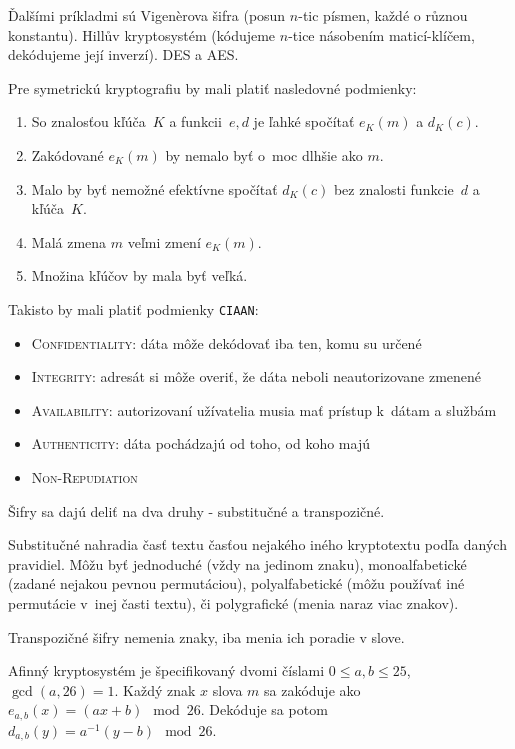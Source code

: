 Ďalšími príkladmi sú Vigenèrova šifra (posun $n$-tic písmen, každé o různou konstantu).
Hillův kryptosystém (kódujeme $n$-tice násobením maticí-klíčem,
dekódujeme její inverzí). DES a AES.

Pre symetrickú kryptografiu by mali platiť nasledovné podmienky:
\begin{enumerate}
	\item So znalosťou kľúča~$K$ a funkcii~$e,d$ je ľahké spočítať
	$e_K(m)$ a $d_K(c)$.
	\item Zakódované $e_K(m)$ by nemalo byť o~moc dlhšie ako $m$.
	\item Malo by byť nemožné efektívne spočítať $d_K(c)$ bez znalosti
	funkcie~$d$ a kľúča~$K$.
	\item Malá zmena $m$ veľmi zmení $e_K(m)$.
	\item Množina kľúčov by mala byť veľká.
\end{enumerate}

Takisto by mali platiť podmienky \verb|CIAAN|:
\begin{itemize}
	\item \textsc{Confidentiality}: dáta môže dekódovať iba ten, 
	komu su určené
	\item \textsc{Integrity}: adresát si môže overiť, že dáta neboli 
	neautorizovane zmenené
	\item \textsc{Availability}: autorizovaní užívatelia musia mať
	prístup k~dátam a službám
	\item \textsc{Authenticity}: dáta pochádzajú od toho, od koho majú
	\item \textsc{Non-Repudiation}
\end{itemize}

Šifry sa dajú deliť na dva druhy - substitučné a transpozičné.

Substitučné nahradia časť textu časťou nejakého iného kryptotextu
podľa daných pravidiel. Môžu byť jednoduché (vždy na jedinom znaku),
monoalfabetické (zadané nejakou pevnou permutáciou),
polyalfabetické (môžu používať iné permutácie v~inej časti textu),
či polygrafické (menia naraz viac znakov).

Transpozičné šifry nemenia znaky, iba menia ich poradie v slove.

\begin{example}
	Afinný kryptosystém je špecifikovaný dvomi číslami $0 \leq a,b \leq 25$,
	$\gcd(a,26)=1$. Každý znak $x$ slova $m$ sa zakóduje ako $e_{a,b}(x)=(ax+b)\mod 26$.
	Dekóduje sa potom $d_{a,b}(y) = a^{-1}(y-b)\mod 26$.
\end{example}


